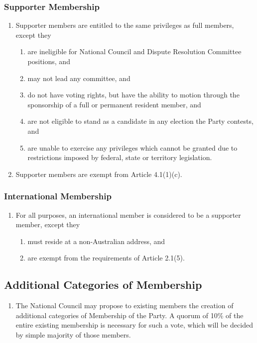 \documentclass[a4paper,titlepage,8.5pt]{article}
\begin{document}
\subsubsection{Supporter Membership}
\begin{enumerate}
\item Supporter members are entitled to the same privileges as full members, except they
\begin{enumerate}
\item are ineligible for National Council and Dispute Resolution Committee positions, and
\item may not lead any committee, and
\item do not have voting rights, but have the ability to motion through the sponsorship of a full or permanent resident member, and
\item are not eligible to stand as a candidate in any election the Party contests, and
\item are unable to exercise any privileges which cannot be granted due to restrictions imposed by federal, state or territory legislation.
\end{enumerate}
\item Supporter members are exempt from Article 4.1(1)(c).
\end{enumerate}

\subsubsection{International Membership}
\begin{enumerate}
\item For all purposes, an international member is considered to be a supporter member, except they
\begin{enumerate}
\item must reside at a non-Australian address, and
\item are exempt from the requirements of Article 2.1(5).
\end{enumerate}
\end{enumerate}

\subsection{Additional Categories of Membership}

\begin{enumerate}
\item The National Council may propose to existing members the creation of additional categories of Membership of the Party. A quorum of 10\% of the entire existing membership is necessary for such a vote, which will be decided by simple majority of those members.
\end{enumerate}
\end{document}
